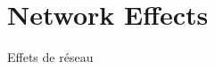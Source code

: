 \newpage

\section{Network Effects}{Effets de réseau}

\label{app:sec:interactiongibrat}









 


%














